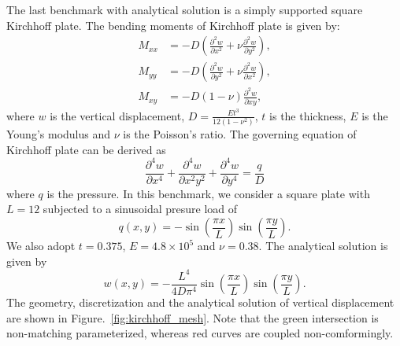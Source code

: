 The last benchmark with analytical solution is a simply supported square Kirchhoff plate. The bending moments of Kirchhoff plate is given by:
\begin{equation}
	\begin{split}
		M_{xx} &= -D\left( \frac{\partial^2 w}{\partial x^2} + \nu \frac{\partial^2 w}{\partial y^2}\right),\\
		M_{yy} &= -D\left( \frac{\partial^2 w}{\partial y^2} + \nu \frac{\partial^2 w}{\partial x^2}\right),\\
		M_{xy} &= -D(1-\nu) \frac{\partial^2 w}{\partial xy},
	\end{split}
\end{equation}
where $w$ is the vertical displacement, $D = \frac{Et^3}{12(1-\nu^2)}$, $t$ is the thickness, $E$ is the Young's modulus and $\nu$ is the Poisson's ratio. The governing equation of Kirchhoff plate can be derived as
\begin{equation}
	\frac{\partial^4 w}{\partial x^4} + \frac{\partial^4 w}{\partial x^2y^2} + \frac{\partial^4 w}{\partial y^4} = \frac{q}{D}
\end{equation}
where $q$ is the pressure. In this benchmark, we consider a square plate with $L=12$ subjected to a sinusoidal presure load of
\begin{equation}
	q(x,y) = -\sin(\frac{\pi x}{L}) \sin(\frac{\pi y}{L}).
\end{equation}
We also adopt $t=0.375$, $E=4.8\times 10^5$ and $\nu = 0.38$. The analytical solution is given by
\begin{equation}
	w(x, y) = -\frac{L^4}{4D\pi^4}\sin(\frac{\pi x}{L}) \sin(\frac{\pi y}{L}).
\end{equation}
The geometry, discretization and the analytical solution of vertical displacement are shown in Figure.~\ref{fig:kirchhoff_mesh}. Note that the green intersection is non-matching parameterized, whereas red curves are coupled non-comformingly. \par

